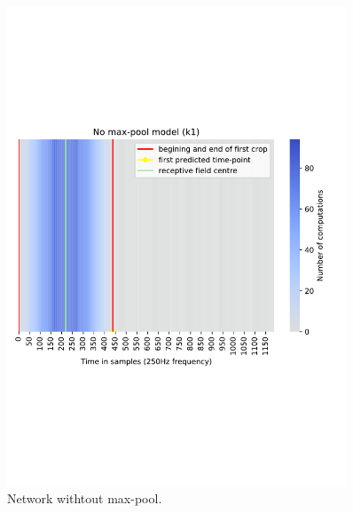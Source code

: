 \begin{figure}
\begin{minipage}{0.45\textwidth}
        \includegraphics[width=0.9\textwidth]{img/ch3/k1-receptive-field} %
        \caption{Network withtout max-pool.}
    \end{minipage}
\end{figure}\label{fig:receptive-field-comparison}

\lipsum[3]


